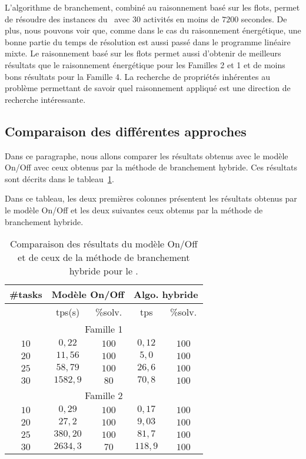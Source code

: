 L'algorithme de branchement, combiné au raisonnement basé sur les
flots, permet de résoudre des instances du \CECSP~avec $30$ activités en
moins de $7200$ secondes. De plus, nous pouvons voir que, comme dans
le cas du raisonnement énergétique, une bonne
partie du temps de résolution est aussi passé dans le programme linéaire
mixte. Le raisonnement basé sur les flots permet aussi d'obtenir de
meilleurs résultats que le raisonnement énergétique pour les Familles 2
et 1 et de moins bons résultats pour la Famille 4. La recherche de
propriétés inhérentes au problème permettant de savoir quel 
raisonnement appliqué est une direction de recherche intéressante. 

\subsection{Comparaison des différentes approches}

Dans ce paragraphe, nous allons comparer les résultats obtenus avec le
modèle On/Off avec ceux obtenus par la méthode de branchement
hybride. Ces résultats sont décrits dans le
tableau~\ref{tab:comp_OOBB}.

Dans ce tableau, les deux premières colonnes présentent les résultats
obtenus par le modèle On/Off et les deux suivantes ceux obtenus par
la méthode de branchement hybride.   
\begin{table}[!htb]
  \begin{center}
    \begin{tabular}{|c|cc|cc|}
      \hline
      \#tasks & \multicolumn{2}{c|}{Modèle On/Off}&
                                                    \multicolumn{2}{c|}{Algo. hybride}\\ 
      \hline 
              & tps(s) &\%solv. & tps & \%solv.\\ 
      \hline
      \multicolumn{5}{|c|}{Famille 1}\\
      \hline 
      $10 $& $0,22$ & $100$ & $0,12$ &  $100$ \\ 
      $20 $& $11,56$ & $100$ & $5,0$ & $100$ \\ 
      $25 $& $58,79$ & $100$ & $26,6$ &$100 $ \\ 
      $30 $& $1582,9$ & $80$ & $70,8$ & $100 $ \\  
      \hline 
      \multicolumn{5}{|c|}{Famille 2}\\
      \hline 
      $10 $& $0,29$ & $100$ & $0,17$ &$100 $ \\ 
      $20 $& $27,2$ & $100$ & $9,03$&$100 $ \\ 
      $25 $& $380,20$ & $100$ & $81,7$ &$100 $ \\ 
      $30 $& $2634,3$ & $70$ & $118,9$ &$100 $ \\  
      \hline 
    \end{tabular}
  \end{center}
  \caption{Comparaison des résultats du modèle On/Off et de ceux de la
    méthode de branchement hybride pour le \CECSP.}
  \label{tab:comp_OOBB}
\end{table}

